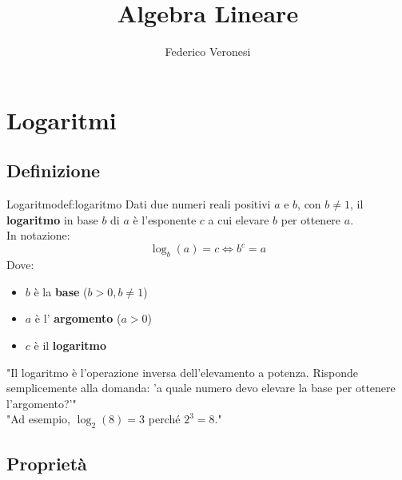 \documentclass{article}
\title{Algebra Lineare}
\author{Federico Veronesi}
\begin{document}
\maketitle

{
    \hypersetup{linkcolor=black}
    \tableofcontents
}

\section{Logaritmi}

\subsection{Definizione}

\begin{definition}{Logaritmo}{def:logaritmo}
    Dati due numeri reali positivi $a$ e $b$, con $b \neq 1$, il \textbf{logaritmo} in base $b$ di $a$ è l'esponente $c$ a cui elevare $b$ per ottenere $a$.
    \\[1em]
    In notazione:
    $$ \log_b(a) = c \iff b^c = a $$
    Dove:
    \begin{itemize}
        \item $b$ è la \textbf{base} ($b > 0, b \neq 1$)
        \item $a$ è l' \textbf{argomento} ($a > 0$)
        \item $c$ è il \textbf{logaritmo}
    \end{itemize}
    \vspace{1em}
    "Il logaritmo è l'operazione inversa dell'elevamento a potenza. Risponde semplicemente alla domanda: 'a quale numero devo elevare la base per ottenere l'argomento?'"
    \\[1em]
    "Ad esempio, $\log_2(8) = 3$ perché $2^3 = 8$."
\end{definition}

\subsection{Proprietà}
\end{document}
